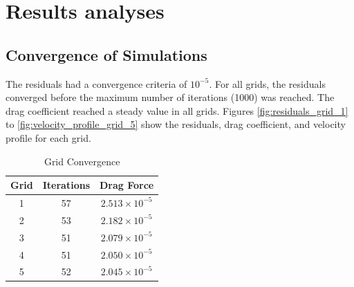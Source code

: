 \section{Results analyses}
\subsection{Convergence of Simulations}
The residuals had a convergence criteria of $10^{-5}$. For all grids, the residuals converged before the maximum number of iterations (1000) was reached. The drag coefficient reached a steady value in all grids. Figures \ref{fig:residuals_grid_1} to \ref{fig:velocity_profile_grid_5} show the residuals, drag coefficient, and velocity profile for each grid.
\begin{table}[h]
    \centering
    \caption{Grid Convergence}
    \label{tab:grid_convergence}
    \begin{tabular}{ccc}
        \toprule
        Grid & Iterations & Drag Force \\
        \midrule
        1 & 57 & $2.513 \times 10^{-5}$ \\
        2 & 53 & $2.182 \times 10^{-5}$ \\
        3 & 51 & $2.079 \times 10^{-5}$ \\
        4 & 51 & $2.050 \times 10^{-5}$ \\
        5 & 52 & $2.045 \times 10^{-5}$ \\
        \bottomrule
    \end{tabular}
\end{table}
